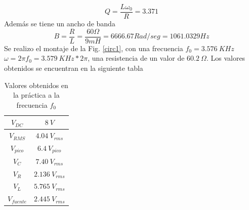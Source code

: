 \documentclass[twocolumn]{IEEEtran}
\begin{document}
\begin{equation}
Q=\frac{L\omega_0}{R}=3.371
\label{ecu104}
\end{equation}
\noindent
Además  se tiene un ancho de banda
\begin{equation}
B=\frac{R}{L}=\frac{60\Omega}{9mH}=6666.67 Rad/seg=1061.0329 Hz
\label{ecu104}
\end{equation}
\noindent
Se realizo el montaje de la Fig. \ref{circ1}, con una frecuencia $f_{0} = 3.576\ KHz$ $\omega = 2\pi f_{0} = 3.579\ KHz * 2 \pi$, una resistencia de un valor de $60.2\ \Omega$. Los valores obtenidos se encuentran en la siguiente tabla
\begin{table}[H]
	\centering
\begin{tabular}[c]{|c|c|} \hline
$V_{DC}$ & $8 \ V$ \\ \hline
$V_{RMS}$ & $4.04 \ V_{rms}$ \\ \hline
$V_{pico}$ & $6.4 \ V_{pico}$ \\ \hline
$V_{C}$ & $7.40 \ V_{rms}$ \\ \hline
$V_{R}$ & $2.136 \ V_{rms}$ \\ \hline
$V_{L}$ & $5.765 \ V_{rms}$ \\ \hline
$V_{fuente}$ & $2.445 \ V_{rms}$ \\ \hline
\end{tabular}
	\caption{Valores obtenidos en la práctica a la frecuencia $f_0$}
	\label{tab1}
\end{table}
\end{document}
